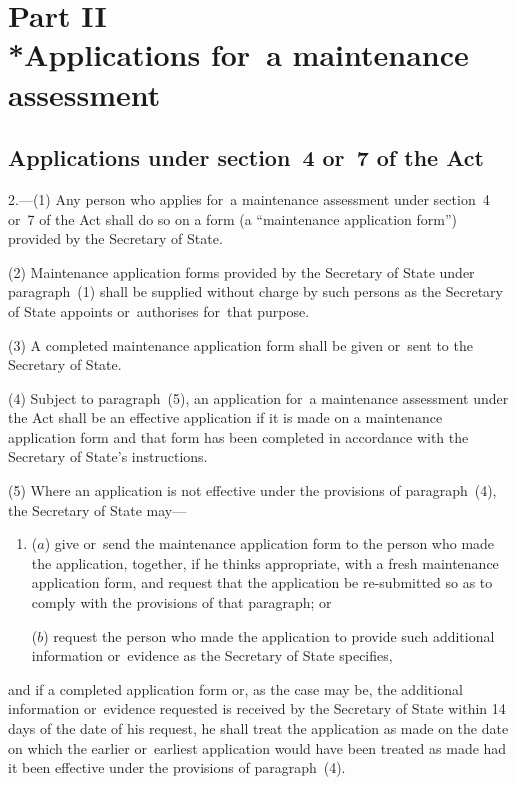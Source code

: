 \documentclass[a4paper,12pt]{article}
\begin{document}
\section[Part II --- Applications for~a maintenance assessment]{Part II\\*Applications for~a maintenance assessment}

\renewcommand\parthead{--- Part II}

\subsection[2. Applications under section~4
or~7 of the Act]{Applications under section~4
or~7 of the Act}

2.—(1) Any person who applies for~a maintenance assessment under section~4 or~7 of the Act shall do so on a form (a “maintenance application form”) provided by the Secretary of State.

(2) Maintenance application forms provided by the Secretary of State 
under paragraph~(1) shall be supplied without charge by such persons as the Secretary of State appoints or~authorises for~that purpose.

(3) A completed maintenance application form shall be given or~sent to the Secretary of State.

(4) Subject to paragraph~(5), an application for~a maintenance assessment under the Act shall be an effective application if it is made on a maintenance application form and that form has been completed in accordance with the Secretary of State’s instructions.

(5) Where an application is not effective under the provisions of paragraph~(4), the Secretary of State may—
\begin{enumerate}\item[]
($a$) give or~send the maintenance application form to the person who made the application, together, if he thinks appropriate, with a fresh maintenance application form, and request that the application be re-submitted so as to comply with the provisions of that paragraph; or

($b$) request the person who made the application to provide such additional information or~evidence as the Secretary of State specifies,
\end{enumerate}
and if a completed application form or, as the case may be, the additional information or~evidence requested is received by the Secretary of State within 14 days of the date of his request, he shall treat the application as made on the date on which the earlier or~earliest application would have been treated as made had it been effective under the provisions of paragraph~(4).
\end{document}
